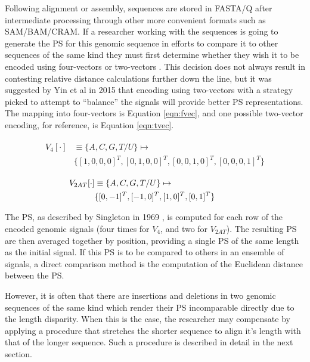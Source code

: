 \documentclass[10pt,conference]{IEEEtran}
\begin{document}
Following alignment or assembly, sequences are stored in FASTA/Q after intermediate processing through other more convenient formats such as SAM/BAM/CRAM. 
If a researcher working with the sequences is going to generate the PS for this genomic sequence in efforts to compare it to other sequences of the same kind they must first determine whether they wish it to be encoded using four-vectors or two-vectors \cite{Vos92}.
This decision does not always result in contesting relative distance calculations further down the line, but it was suggested by Yin et al in 2015 \cite{yin15} 
that encoding using two-vectors with a strategy picked to attempt to ``balance'' the signals will provide better PS representations.  
The mapping into four-vectors is Equation \ref{eqn:fvec}, and one possible two-vector encoding, for reference, is Equation \ref{eqn:tvec}. 

\noindent 
\begin{align}
\begin{split}
\label{eqn:fvec}
V_4[\cdot] &\equiv \{A,C,G,T/U\} \mapsto \\
& \{ [1,0,0,0]^T,[0,1,0,0]^T,[0,0,1,0]^T,[0,0,0,1]^T\}
\end{split}
\end{align}


\noindent 
\begin{align}
\begin{split}
\hspace{-8 em}
\label{eqn:tvec}
V_{2AT}[\cdot] &\equiv\{A,C,G,T/U\} \mapsto \\
& \{ [0,-1]^T,[-1,0]^T,[1,0]^T,[0,1]^T\}
\end{split}
\end{align}


The PS, as described by Singleton in 1969 \cite{Sin69}, is computed for each row of the encoded genomic signals (four times for $V_4$, and two for $V_{2AT}$).
The resulting PS are then averaged together by position, providing a single PS of the same length as the initial signal. 
If this PS is to be compared to others in an ensemble of signals, a direct comparison method is the 
computation of the Euclidean distance between the PS. 

However, it is often that there are insertions and deletions in two genomic sequences of the same kind 
which render their PS incomparable directly due to the length disparity. 
When this is the case, the researcher may compensate by applying a procedure that stretches the 
shorter sequence to align it's length with that of the longer sequence. 
Such a procedure \cite{yin15} is described in detail in the next section. 
\end{document}
